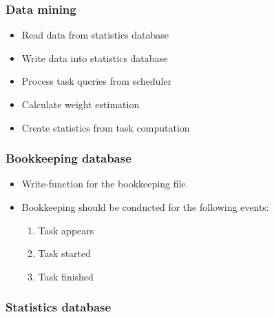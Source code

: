 {		\subsubsection{Data mining}
	
			\begin{itemize}
				\item Read data from statistics database
				\item Write data into statistics database
				\item Process task queries from scheduler
				\item Calculate weight estimation 
				\item Create statistics from task computation
			\end{itemize}
	
	
		
		
		\subsubsection{Bookkeeping database}
	
			\begin{itemize}
				\item Write-function for the bookkeeping file.
				\item Bookkeeping should be conducted for the following events:
				\begin{enumerate}
					\item Task appears
					\item Task started
					\item Task finished 
				\end{enumerate}
			\end{itemize}
	
		\subsubsection{Statistics database}
	
			\begin{itemize}
				

\end{itemize}}
